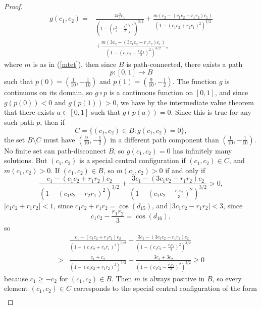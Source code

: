 \documentclass[12pt]{amsart}
\theoremstyle{definition}
\begin{document}
{\begin{proof}
\begin{align*}
g(c_1,c_2)=&\frac{4r_1^2c_1}{(1-(c_1^2-\frac{r_1^2}{3})^2)^{3/2}}+\frac{m(c_2-(c_1c_2+r_1r_2)c_1)}{(1-(c_1c_2+r_2r_1)^2)^{3/2}}\\
&+\frac{m(3c_2-(3c_1c_2-r_1r_2)c_1)}{(1-(c_1c_2-\frac{r_1r_2}{3})^2)^{3/2}},\end{align*}
where $m$ is as in (\ref{mtet}), then since $B$ is path-connected, there exists a path 
$$
p\colon[0,1] \to B
$$ 
such that $p(0)=(\frac{1}{10},-\frac{1}{10})$ and $p(1)=(\frac{9}{10},-\frac{1}{2})$. The function $g$ is continuous on its domain, so $g \circ p$ is a continuous function on $[0,1]$, and since $g(p(0))<0$ and $g(p(1))>0$, we have by the intermediate value theorem that there exists $a \in [0,1]$ such that $g(p(a))=0$. Since this is true for any such path $p$, then if 
$$
C=\{(c_1,c_2) \in B: g(c_1,c_2)=0\},
$$
the set $B\setminus C$ must have $(\frac{9}{10}, -\frac{1}{2})$ in a different path component than $(\frac{1}{10}, -\frac{1}{10})$. No finite set can path-disconnect $B$, so $g(c_1,c_2)=0$ has infinitely many solutions. But $(c_1,c_2)$ is a special central configuration if $(c_1,c_2) \in C$, and $m(c_1,c_2) >0$. If $(c_1,c_2) \in B$, so $m(c_1,c_2)>0$ if and only if \begin{equation*}
\frac{c_1-(c_1c_2+r_1r_2)c_2}{(1-(c_1c_2+r_2r_1)^2)^{3/2}}+\frac{3c_1-(3c_1c_2-r_1r_2)c_2}{(1-(c_1c_2-\frac{r_1r_2}{3})^2)^{3/2}}>0,
\end{equation*}
$|c_1c_2+r_1r_2| < 1$, since $c_1c_2+r_1r_2=\cos(d_{15})$, and $|3c_1c_2-r_1r_2|< 3$, since 
$$
c_1c_2-\frac{r_1r_2}{3}=\cos(d_{16}),
$$ so 
\begin{align*}
&\frac{c_1-(c_1c_2+r_1r_2)c_2}{(1-(c_1c_2+r_2r_1)^2)^{3/2}}+\frac{3c_1-(3c_1c_2-r_1r_2)c_2}{(1-(c_1c_2-\frac{r_1r_2}{3})^2)^{3/2}}\\
> &\frac{c_1+c_2}{(1-(c_1c_2+r_1r_2)^2)^{3/2}}+\frac{3c_1+3c_2}{(1-(c_1c_2-\frac{r_1r_2}{3})^2)^{3/2}}
\geq 0
\end{align*}
because $c_1 \geq -c_2 $ for $(c_1,c_2) \in B$. Then $m$ is always positive in $B$, so every element $(c_1,c_2) \in C$ corresponds to the special central configuration of the form 
\begin{align*}

\end{align*}
\end{proof}}
\end{document}
